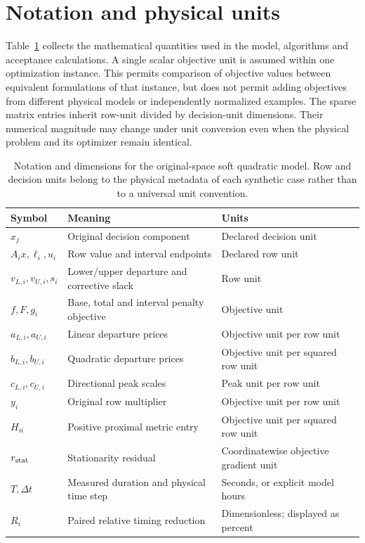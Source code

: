 \section{Notation and physical units}\label{sec:notation}
Table~\ref{tab:notation} collects the mathematical quantities used in the model,
algorithms and acceptance calculations. A single scalar objective unit is assumed
within one optimization instance. This permits comparison of objective values
between equivalent formulations of that instance, but does not permit adding
objectives from different physical models or independently normalized examples.
The sparse matrix entries inherit row-unit divided by decision-unit dimensions.
Their numerical magnitude may change under unit conversion even when the physical
problem and its optimizer remain identical.

\begin{table}[htbp]\centering\small
\caption{Notation and dimensions for the original-space soft quadratic model. Row and decision units belong to the physical metadata of each synthetic case rather than to a universal unit convention.}\label{tab:notation}
\begin{tabularx}{\textwidth}{@{}lXX@{}}\toprule
Symbol & Meaning & Units\\\midrule
$x_j$ & Original decision component & Declared decision unit\\
$A_i x,\ell_i,u_i$ & Row value and interval endpoints & Declared row unit\\
$v_{L,i},v_{U,i},s_i$ & Lower/upper departure and corrective slack & Row unit\\
$f,F,g_i$ & Base, total and interval penalty objective & Objective unit\\
$a_{L,i},a_{U,i}$ & Linear departure prices & Objective unit per row unit\\
$b_{L,i},b_{U,i}$ & Quadratic departure prices & Objective unit per squared row unit\\
$c_{L,i},c_{U,i}$ & Directional peak scales & Peak unit per row unit\\
$y_i$ & Original row multiplier & Objective unit per row unit\\
$H_{ii}$ & Positive proximal metric entry & Objective unit per squared row unit\\
$r_{\rm stat}$ & Stationarity residual & Coordinatewise objective gradient unit\\
$T,\Delta t$ & Measured duration and physical time step & Seconds, or explicit model hours\\
$R_i$ & Paired relative timing reduction & Dimensionless; displayed as percent\\\bottomrule
\end{tabularx}
\end{table}

